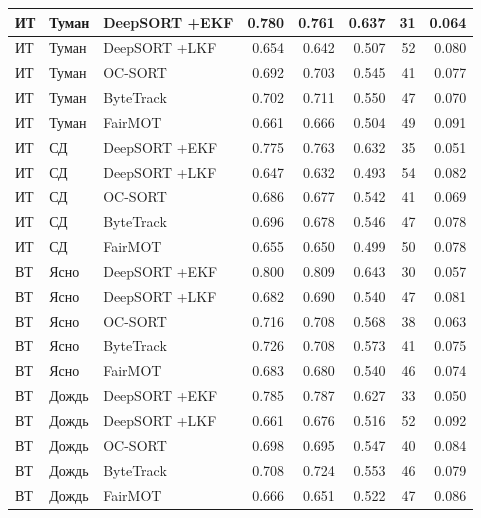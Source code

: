 \begin{longtable}{|p{2.42cm}|p{1.8cm}|p{2.4cm}|r|r|r|r|r|}
       ИТ     &      Туман & DeepSORT +EKF & 0.780 & 0.761 & 0.637 &   31 & 0.064     \\ \hline
       ИТ     &      Туман & DeepSORT +LKF & 0.654 & 0.642 & 0.507 &   52 & 0.080     \\ \hline
       ИТ     &      Туман &      OC-SORT & 0.692 & 0.703 & 0.545 &   41 & 0.077      \\ \hline
       ИТ     &      Туман &    ByteTrack & 0.702 & 0.711 & 0.550 &   47 & 0.070      \\ \hline
       ИТ     &      Туман &      FairMOT & 0.661 & 0.666 & 0.504 &   49 & 0.091      \\ \hline
       ИТ     &      СД & DeepSORT +EKF & 0.775 & 0.763 & 0.632 &   35 & 0.051               \\ \hline
       ИТ     &      СД & DeepSORT +LKF & 0.647 & 0.632 & 0.493 &   54 & 0.082               \\ \hline
       ИТ     &      СД &      OC-SORT & 0.686 & 0.677 & 0.542 &   41 & 0.069                \\ \hline
       ИТ     &      СД &    ByteTrack & 0.696 & 0.678 & 0.546 &   47 & 0.078                \\ \hline
       ИТ     &      СД &      FairMOT & 0.655 & 0.650 & 0.499 &   50 & 0.078                \\ \hline
       ВТ     &      Ясно & DeepSORT +EKF & 0.800 & 0.809 & 0.643 &   30 & 0.057         \\ \hline
       ВТ     &      Ясно & DeepSORT +LKF & 0.682 & 0.690 & 0.540 &   47 & 0.081         \\ \hline
       ВТ     &      Ясно &      OC-SORT & 0.716 & 0.708 & 0.568 &   38 & 0.063  \\ \hline
       ВТ     &      Ясно &    ByteTrack & 0.726 & 0.708 & 0.573 &   41 & 0.075  \\ \hline
       ВТ     &      Ясно &      FairMOT & 0.683 & 0.680 & 0.540 &   46 & 0.074  \\ \hline
       ВТ     &      Дождь & DeepSORT +EKF & 0.785 & 0.787 & 0.627 &   33 & 0.050  \\ \hline
       ВТ     &      Дождь & DeepSORT +LKF & 0.661 & 0.676 & 0.516 &   52 & 0.092  \\ \hline
       ВТ     &      Дождь &      OC-SORT & 0.698 & 0.695 & 0.547 &   40 & 0.084  \\ \hline
       ВТ     &      Дождь &    ByteTrack & 0.708 & 0.724 & 0.553 &   46 & 0.079  \\ \hline
       ВТ     &      Дождь &      FairMOT & 0.666 & 0.651 & 0.522 &   47 & 0.086  \\ \hline

\end{longtable}
